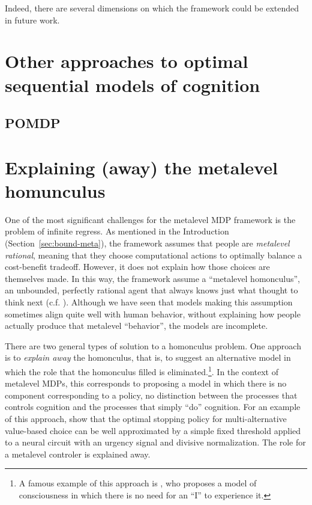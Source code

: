 \label{conclusion}


Indeed, there are several dimensions on which the framework could be extended in future work.






\section{Other approaches to optimal sequential models of cognition}



\subsection{POMDP}\label{sec:alternative-pomdp}


\section{Explaining (away) the metalevel homunculus}

One of the most significant challenges for the metalevel MDP framework is the problem of infinite regress. As mentioned in the Introduction (Section~\ref{sec:bound-meta}), the framework assumes that people are \emph{metalevel rational}, meaning that they choose computational actions to optimally balance a cost-benefit tradeoff. However, it does not explain how those choices are themselves made. In this way, the framework assume a ``metalevel homonculus'', an unbounded, perfectly rational agent that always knows just what thought to think next (c.f. \citealp{botvinick2014computational}). Although we have seen that models making this assumption sometimes align quite well with human behavior, without explaining how people actually produce that metalevel ``behavior'', the models are incomplete.

There are two general types of solution to a homonculus problem. One approach is to \emph{explain away} the homonculus, that is, to suggest an alternative model in which the role that the homonculus filled is eliminated.\footnote{%
  A famous example of this approach is \citet{dennett1993consciousness}, who proposes a model of consciousness in which there is no need for an ``I'' to experience it.
}. In the context of metalevel MDPs, this corresponds to proposing a model in which there is no component corresponding to a policy, no distinction between the processes that controls cognition and the processes that simply ``do'' cognition. For an example of this approach, \citet{tajima2019optimal} show that the optimal stopping policy for multi-alternative value-based choice can be well approximated by a simple fixed threshold applied to a neural circuit with an urgency signal and divisive normalization. The role for a metalevel controler is explained away.

